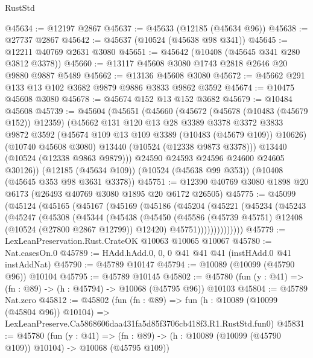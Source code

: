 \begin{lexlean}{RustStd}
\begin{coremodule}
@45634 := @12197 @2867
@45637 := @45633 (@12185 (@45634 @96))
@45638 := @27737 @2867
@45642 := @45637 (@10524 (@45638 @98 @341))
@45645 := @12211 @40769 @2631 @3080
@45651 := @45642 (@10408 (@45645 @341 @280 @3812 @3378))
@45660 := @13117 @45608 @3080 @1743 @2818 @2646 @20 @9880 @9887 @5489
@45662 := @13136 @45608 @3080
@45672 := @45662 @291 @133 @13 @102 @3682 @9879 @9886 @3833 @9862 @3592
@45674 := @10475 @45608 @3080
@45678 := @45674 @152 @13 @152 @3682
@45679 := @10484 @45608
@45739 := @45604
    (@45651
      (@45660
        (@45672
          (@45678 (@10483 (@45679 @152)) @12359)
          (@45662
            @131
            @120
            @13
            @28
            @3389
            @3378
            @3372
            @3833
            @9872
            @3592
            (@45674 @109 @13 @109 @3389 (@10483 (@45679 @109)) @10626)
            (@10740 @45608 @3080)
            @13440
            (@10524 (@12338 @9873 @3378)))
          @13440
          (@10524 (@12338 @9863 @9879)))
        @24590
        @24593
        @24596
        @24600
        @24605
        @30126))
    (@12185 (@45634 @109))
    (@10524 (@45638 @99 @353))
    (@10408 (@45645 @353 @98 @3631 @3378))
@45751 := @12390 @40769 @3080 @1898 @20 @6173 (@26493 @40769 @3080 @1895 @20 @6172 @26505)
@45775 := @45099
    (@45124
      (@45165
        (@45167
          (@45169
            (@45186
              (@45204
                (@45221
                  (@45234
                    (@45243
                      (@45247
                        (@45308
                          (@45344
                            (@45438
                              (@45450
                                (@45586
                                  (@45739 @45751)
                                  @12408
                                  (@10524 (@27800 @2867 @12799))
                                  @12420)
                                @45751))))))))))))))
@45779 := LexLeanPreservation.Rust.CrateOK @10063 @10065 @10067
@45780 := Nat.casesOn.{0}
@45789 := HAdd.hAdd.{0, 0, 0} @41 @41 @41 (instHAdd.{0} @41 instAddNat)
@45790 := @45789 @10147
@45794 := @10089 (@10099 (@45790 @96)) @10104
@45795 := @45789 @10145
@45802 := @45780 (fun (y : @41) => (fn : @89) -> (h : @45794) -> @10068 (@45795 @96)) @10103
@45804 := @45789 Nat.zero
@45812 := @45802
    (fun (fn : @89) =>
    fun (h : @10089 (@10099 (@45804 @96)) @10104) =>
    LexLeanPreserve.Ca5868606daa431fa5d85f3706cb418f3.R1.RustStd.fun0)
@45831 := @45780
    (fun (y : @41) =>
    (fn : @89) -> (h : @10089 (@10099 (@45790 @109)) @10104) -> @10068 (@45795 @109))

\end{coremodule}
\end{lexlean}
